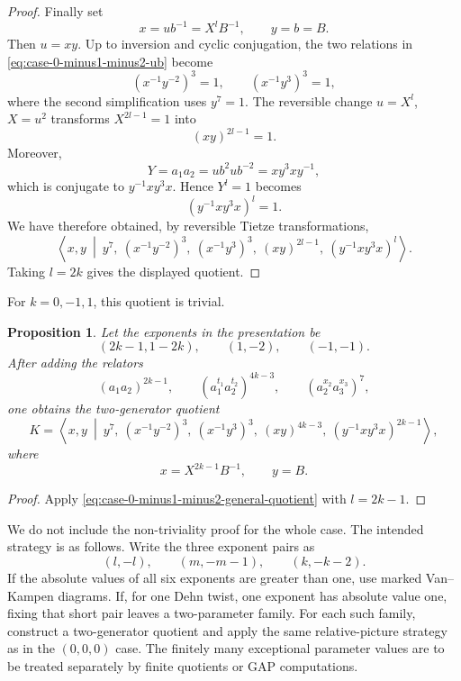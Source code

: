 \documentclass{article}
\newtheorem{prop}[theorem]{Proposition}
\begin{document}
\begin{proof}
Finally set
\[
   x=ub^{-1}=X^lB^{-1},\qquad y=b=B.
\]
Then $u=xy$.  Up to inversion and cyclic conjugation, the two
relations in \eqref{eq:case-0-minus1-minus2-ub} become
\[
   (x^{-1}y^{-2})^3=1,
   \qquad
   (x^{-1}y^3)^3=1,
\]
where the second simplification uses $y^7=1$.  The reversible change
$u=X^l$, $X=u^2$ transforms $X^{2l-1}=1$ into
\[
   (xy)^{2l-1}=1.
\]
Moreover,
\[
   Y=a_1a_2=ub^2ub^{-2}=xy^3xy^{-1},
\]
which is conjugate to $y^{-1}xy^3x$.  Hence $Y^l=1$ becomes
\[
   (y^{-1}xy^3x)^l=1.
\]
We have therefore obtained, by reversible Tietze transformations,
\begin{equation}
\label{eq:case-0-minus1-minus2-general-quotient}
\left\langle x,y \ \middle|\
 y^7,\ (x^{-1}y^{-2})^3,\ (x^{-1}y^3)^3,\
 (xy)^{2l-1},\ (y^{-1}xy^3x)^l
\right\rangle .
\end{equation}
Taking $l=2k$ gives the displayed quotient.
\end{proof}

For $k=0,-1,1$, this quotient is trivial.

\begin{prop}
Let the exponents in the presentation be
\[
   (2k-1,1-2k),\qquad (1,-2),\qquad (-1,-1).
\]
After adding the relators
\[
(a_1 a_2)^{2k-1},\qquad
(a_1^{t_1} a_2^{t_2})^{4k-3},\qquad
(a_2^{x_2} a_3^{x_3})^{7},
\]
one obtains the two-generator quotient
\[
K = \left\langle x,y \ \middle|\
 y^{7},\ (x^{-1}y^{-2})^{3},\ (x^{-1}y^{3})^{3},\
 (xy)^{4k-3},\ (y^{-1}xy^{3}x)^{2k-1}
\right\rangle ,
\]
where
\[
   x=X^{2k-1}B^{-1},\qquad y=B.
\]
\end{prop}

\begin{proof}
Apply \eqref{eq:case-0-minus1-minus2-general-quotient} with
$l=2k-1$.
\end{proof}

We do not include the non-triviality proof for the whole case.  The
intended strategy is as follows.  Write the three exponent pairs as
\[
   (l,-l),\qquad (m,-m-1),\qquad (k,-k-2).
\]
If the absolute values of all six exponents are greater than one, use
marked Van--Kampen diagrams.  If, for one Dehn twist, one exponent has
absolute value one, fixing that short pair leaves a two-parameter family.
For each such family, construct a two-generator quotient and apply the
same relative-picture strategy as in the $(0,0,0)$ case.  The finitely
many exceptional parameter values are to be treated separately by finite
quotients or GAP computations.
\end{document}
